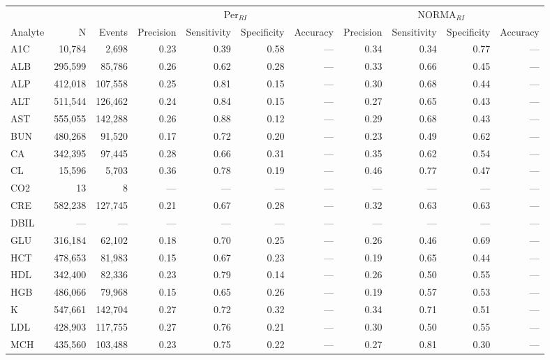 \begin{table}[ht]
\centering
\footnotesize
\begin{tabular}{lrrrrrrrrrr}
\toprule
 & &  & \multicolumn{4}{c}{Per$_{RI}$} & \multicolumn{4}{c}{NORMA$_{RI}$} \\
\cmidrule(lr){4-7} \cmidrule(lr){8-11}
Analyte & N & Events & Precision & Sensitivity & Specificity & Accuracy & Precision & Sensitivity & Specificity & Accuracy \\
\midrule
A1C & 10,784 & 2,698 & 0.23 & 0.39 & 0.58 & --- & 0.34 & 0.34 & 0.77 & --- \\
ALB & 295,599 & 85,786 & 0.26 & 0.62 & 0.28 & --- & 0.33 & 0.66 & 0.45 & --- \\
ALP & 412,018 & 107,558 & 0.25 & 0.81 & 0.15 & --- & 0.30 & 0.68 & 0.44 & --- \\
ALT & 511,544 & 126,462 & 0.24 & 0.84 & 0.15 & --- & 0.27 & 0.65 & 0.43 & --- \\
AST & 555,055 & 142,288 & 0.26 & 0.88 & 0.12 & --- & 0.29 & 0.68 & 0.43 & --- \\
BUN & 480,268 & 91,520 & 0.17 & 0.72 & 0.20 & --- & 0.23 & 0.49 & 0.62 & --- \\
CA & 342,395 & 97,445 & 0.28 & 0.66 & 0.31 & --- & 0.35 & 0.62 & 0.54 & --- \\
CL & 15,596 & 5,703 & 0.36 & 0.78 & 0.19 & --- & 0.46 & 0.77 & 0.47 & --- \\
CO2 & 13 & 8 & --- & --- & --- & --- & --- & --- & --- & --- \\
CRE & 582,238 & 127,745 & 0.21 & 0.67 & 0.28 & --- & 0.32 & 0.63 & 0.63 & --- \\
DBIL & --- & --- & --- & --- & --- & --- & --- & --- & --- & --- \\
GLU & 316,184 & 62,102 & 0.18 & 0.70 & 0.25 & --- & 0.26 & 0.46 & 0.69 & --- \\
HCT & 478,653 & 81,983 & 0.15 & 0.67 & 0.23 & --- & 0.19 & 0.65 & 0.44 & --- \\
HDL & 342,400 & 82,336 & 0.23 & 0.79 & 0.14 & --- & 0.26 & 0.50 & 0.55 & --- \\
HGB & 486,066 & 79,968 & 0.15 & 0.65 & 0.26 & --- & 0.19 & 0.57 & 0.53 & --- \\
K & 547,661 & 142,704 & 0.27 & 0.72 & 0.32 & --- & 0.34 & 0.71 & 0.51 & --- \\
LDL & 428,903 & 117,755 & 0.27 & 0.76 & 0.21 & --- & 0.30 & 0.50 & 0.55 & --- \\
MCH & 435,560 & 103,488 & 0.23 & 0.75 & 0.22 & --- & 0.27 & 0.81 & 0.30 & --- \\

\end{tabular}
\end{table}

